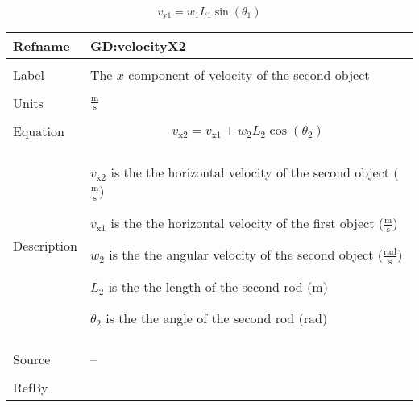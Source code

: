 \documentclass[12pt]{article}
\begin{document}
\begin{displaymath}
{v_{\text{y}1}}={w_{1}} {L_{1}} \sin\left({θ_{1}}\right)
\end{displaymath}
\vspace{\baselineskip}
\noindent
\begin{minipage}{\textwidth}
\begin{tabular}{>{\raggedright}p{}>{\raggedright\arraybackslash}p{}}
\toprule \textbf{Refname} & \textbf{GD:velocityX2}
\label{GD:velocityX2}
\\ \midrule \\
Label & The $x$-component of velocity of the second object
        
\\ \midrule \\
Units & $\frac{\text{m}}{\text{s}}$
        
\\ \midrule \\
Equation & \begin{displaymath}
           {v_{\text{x}2}}={v_{\text{x}1}}+{w_{2}} {L_{2}} \cos\left({θ_{2}}\right)
           \end{displaymath}
\\ \midrule \\
Description & \begin{symbDescription}
              \item{${v_{\text{x}2}}$ is the the horizontal velocity of the second object ($\frac{\text{m}}{\text{s}}$)}
              \item{${v_{\text{x}1}}$ is the the horizontal velocity of the first object ($\frac{\text{m}}{\text{s}}$)}
              \item{${w_{2}}$ is the the angular velocity of the second object ($\frac{\text{rad}}{\text{s}}$)}
              \item{${L_{2}}$ is the the length of the second rod (${\text{m}}$)}
              \item{${θ_{2}}$ is the the angle of the second rod (${\text{rad}}$)}
              \end{symbDescription}
\\ \midrule \\
Source & --
         
\\ \midrule \\
RefBy & 
\\ \bottomrule
\end{tabular}
\end{minipage}
\end{document}
